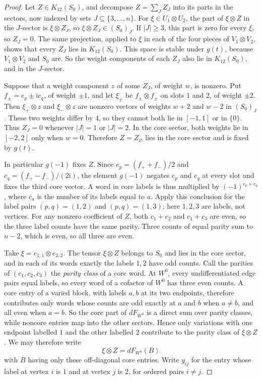 \documentclass[11pt]{article}
\theoremstyle{remark}\newtheorem{remark}[theorem]{Remark}
\begin{document}
\begin{proof}
Let $Z\in K_{12}(S_0)$, and decompose $Z=\sum_JZ_J$ into its parts in
the sectors, now indexed by sets $J\subseteq\{3,\ldots,n\}$. For
$\xi\in U_1\otimes U_2$, the part of $\xi\otimes Z$ in the $J$-sector
is $\xi\otimes Z_J$, so $\xi\otimes Z_J\in(S_0)_J$. If $|J|\geq3$, this
part is zero for every $\xi$, so $Z_J=0$. The same projection, applied
to $\xi$ in each of the four pieces of $V_1\otimes V_2$, shows that
every $Z_J$ lies in $K_{12}(S_0)$. This space is stable under $g(t)$,
because $V_1\otimes V_2$ and $S_0$ are. So the weight components of
each $Z_J$ also lie in $K_{12}(S_0)$, and in the $J$-sector.

Suppose that a weight component $z$ of some $Z_J$, of weight $w$, is
nonzero. Put $f_\pm=e_p\pm\mathrm ie_q$, of weight $\pm1$, and let
$\xi_\pm$ be $f_\pm\otimes f_\pm$ on slots $1$ and $2$, of weight
$\pm2$. Then $\xi_+\otimes z$ and $\xi_-\otimes z$ are nonzero vectors
of weights $w+2$ and $w-2$ in $(S_0)_J$. These two weights differ by
$4$, so they cannot both lie in $[-1,1]$ or in $\{0\}$. Thus $Z_J=0$
whenever $|J|=1$ or $|J|=2$. In the core sector, both weights lie in
$[-2,2]$ only when $w=0$. Therefore $Z=Z_\varnothing$ lies in the core
sector and is fixed by $g(t)$.

In particular $g(-1)$ fixes $Z$. Since $e_p=(f_++f_-)/2$ and
$e_q=(f_+-f_-)/(2\mathrm i)$, the element $g(-1)$ negates $e_p$ and
$e_q$ at every slot and fixes the third core vector. A word in core
labels is thus multiplied by $(-1)^{c_p+c_q}$, where $c_a$ is the
number of its labels equal to $a$. Apply this conclusion for the label
pairs $(p,q)=(1,2)$ and $(p,q)=(1,3)$; here $1,2,3$ are labels, not
vertices. For any nonzero coefficient of $Z$, both $c_1+c_2$ and
$c_1+c_3$ are even, so the three label counts have the same parity.
Three counts of equal parity sum to $n-2$, which is even, so all three
are even.

Take $\xi=e_{1,1}\otimes e_{2,2}$. The tensor $\xi\otimes Z$ belongs to
$S_0$ and lies in the core sector, and in each of its words exactly
the labels $1,2$ have odd counts. Call the parities of $(c_1,c_2,c_3)$
the \emph{parity class} of a core word. At $W^0$, every
undifferentiated edge pairs equal labels, so every word of a cofactor
of $W^0$ has three even counts. A core entry of a varied block, with
labels $a,b$ at its two endpoints, therefore contributes only words
whose counts are odd exactly at $a$ and $b$ when $a\ne b$, and all
even when $a=b$. So the core part of $dF_{W^0}$ is a direct sum over
parity classes, while noncore entries map into the other sectors.
Hence only variations with one endpoint labelled $1$ and the other
labelled $2$ contribute to the parity class of $\xi\otimes Z$. We may
therefore write
\[
 \xi\otimes Z=dF_{W^0}(B)
\]
with $B$ having only these off-diagonal core entries. Write $y_{ij}$
for the entry whose label at vertex $i$ is $1$ and at vertex $j$ is
$2$, for ordered pairs $i\ne j$.


\end{proof}
\end{document}
